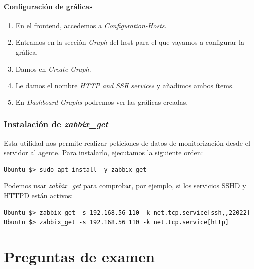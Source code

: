 \documentclass[12pt,spanish]{article}
\begin{document}
\paragraph{Configuración de gráficas}

\begin{enumerate}
  \item En el frontend, accedemos a \textit{Configuration-Hosts}.
  \item Entramos en la sección \textit{Graph} del host para el que vayamos a configurar la gráfica.
  \item Damos en \textit{Create Graph}.
  \item Le damos el nombre \textit{HTTP and SSH services} y añadimos ambos ítems.
  \item En \textit{Dashboard-Graphs} podremos ver las gráficas creadas.
\end{enumerate}


\subsubsection{Instalación de \textit{zabbix\_get}}

Esta utilidad nos permite realizar peticiones de datos de monitorización desde el servidor al agente. Para instalarlo, ejecutamos la siguiente orden:
\begin{lstlisting}
Ubuntu $> sudo apt install -y zabbix-get
\end{lstlisting}

Podemos usar \textit{zabbix\_get} para comprobar, por ejemplo, si los servicios SSHD y HTTPD están activos:

\begin{lstlisting}
Ubuntu $> zabbix_get -s 192.168.56.110 -k net.tcp.service[ssh,,22022]
Ubuntu $> zabbix_get -s 192.168.56.110 -k net.tcp.service[http]
\end{lstlisting}




\newpage
\section{Preguntas de examen}
\end{document}
